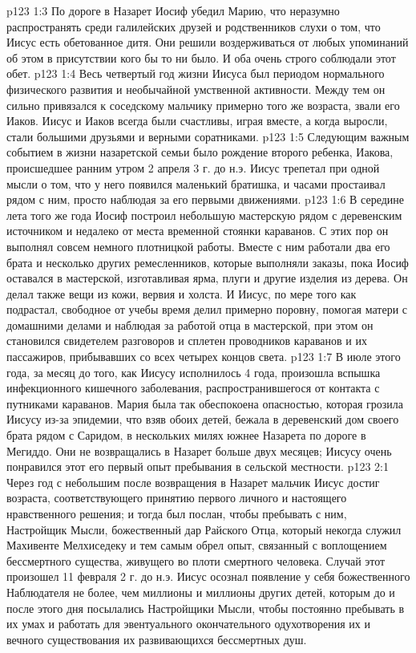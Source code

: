 \vs p123 1:3 По дороге в Назарет Иосиф убедил Марию, что неразумно распространять среди галилейских друзей и родственников слухи о том, что Иисус есть обетованное дитя. Они решили воздерживаться от любых упоминаний об этом в присутствии кого бы то ни было. И оба очень строго соблюдали этот обет.
\vs p123 1:4 Весь четвертый год жизни Иисуса был периодом нормального физического развития и необычайной умственной активности. Между тем он сильно привязался к соседскому мальчику примерно того же возраста, звали его Иаков. Иисус и Иаков всегда были счастливы, играя вместе, а когда выросли, стали большими друзьями и верными соратниками.
\vs p123 1:5 Следующим важным событием в жизни назаретской семьи было рождение второго ребенка, Иакова, происшедшее ранним утром 2 апреля 3 г. до н.э. Иисус трепетал при одной мысли о том, что у него появился маленький братишка, и часами простаивал рядом с ним, просто наблюдая за его первыми движениями.
\vs p123 1:6 В середине лета того же года Иосиф построил небольшую мастерскую рядом с деревенским источником и недалеко от места временной стоянки караванов. С этих пор он выполнял совсем немного плотницкой работы. Вместе с ним работали два его брата и несколько других ремесленников, которые выполняли заказы, пока Иосиф оставался в мастерской, изготавливая ярма, плуги и другие изделия из дерева. Он делал также вещи из кожи, вервия и холста. И Иисус, по мере того как подрастал, свободное от учебы время делил примерно поровну, помогая матери с домашними делами и наблюдая за работой отца в мастерской, при этом он становился свидетелем разговоров и сплетен проводников караванов и их пассажиров, прибывавших со всех четырех концов света.
\vs p123 1:7 В июле этого года, за месяц до того, как Иисусу исполнилось 4 года, произошла вспышка инфекционного кишечного заболевания, распространившегося от контакта с путниками караванов. Мария была так обеспокоена опасностью, которая грозила Иисусу из\hyp{}за эпидемии, что взяв обоих детей, бежала в деревенский дом своего брата рядом с Саридом, в нескольких милях южнее Назарета по дороге в Мегиддо. Они не возвращались в Назарет больше двух месяцев; Иисусу очень понравился этот его первый опыт пребывания в сельской местности.
\vs p123 2:1 Через год с небольшим после возвращения в Назарет мальчик Иисус достиг возраста, соответствующего принятию первого личного и настоящего нравственного решения; и тогда был послан, чтобы пребывать с ним, Настройщик Мысли, божественный дар Райского Отца, который некогда служил Махивенте Мелхиседеку и тем самым обрел опыт, связанный с воплощением бессмертного существа, живущего во плоти смертного человека. Случай этот произошел 11 февраля 2 г. до н.э. Иисус осознал появление у себя божественного Наблюдателя не более, чем миллионы и миллионы других детей, которым до и после этого дня посылались Настройщики Мысли, чтобы постоянно пребывать в их умах и работать для эвентуального окончательного одухотворения их и вечного существования их развивающихся бессмертных душ.
